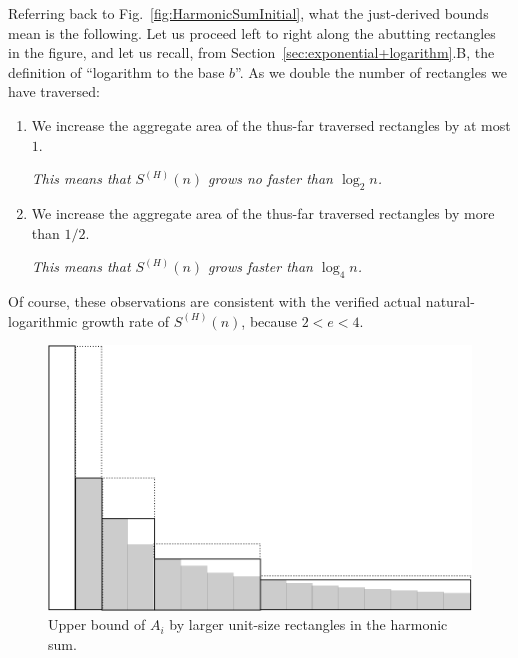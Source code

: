 Referring back to Fig.~\ref{fig:HarmonicSumInitial}, what the
just-derived bounds mean is the following.  Let us proceed left to
right along the abutting rectangles in the figure, and let us recall,
from Section~\ref{sec:exponential+logarithm}.B, the definition of
``logarithm to the base $b$''.  As we double the number of rectangles
we have traversed:
\begin{enumerate}
\item
We increase the aggregate area of the thus-far traversed rectangles by
at most $1$.

{\em This means that $S^{(H)}(n)$ grows no faster than $\log_2 n$.}

\item
We increase the aggregate area of the thus-far traversed rectangles by
more than $1/2$.

{\em This means that $S^{(H)}(n)$ grows faster than $\log_4 n$.}
\end{enumerate}
Of course, these observations are consistent with the verified actual
natural-logarithmic growth rate of $S^{(H)}(n)$, because $2 < e < 4$.

\begin{figure}[htb]
\centerline{
\includegraphics[scale=0.3]{FiguresMaths/HarmonicSumUpperbound}
}
\caption{Upper bound of $A_i$ by larger unit-size rectangles in the harmonic sum.}
\label{fig:HarmonicSumUpperbound}
\end{figure}

